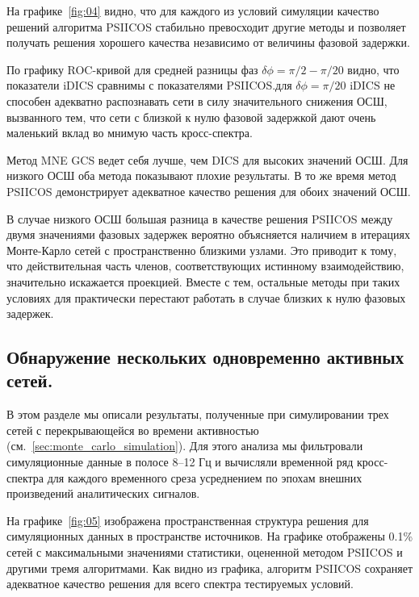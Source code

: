 На графике~\ref{fig:04} видно, что для каждого из условий симуляции качество решений
алгоритма PSIICOS стабильно превосходит другие методы и позволяет получать решения хорошего
качества независимо от величины фазовой задержки.

По графику ROC-кривой для средней разницы фаз $\delta\phi=\pi/2 - \pi/20$ видно, что
показатели iDICS сравнимы с показателями PSIICOS. для $\delta\phi = \pi/20$ iDICS
не способен адекватно распознавать сети в силу значительного снижения ОСШ, вызванного
тем, что сети с близкой к нулю фазовой задержкой дают очень маленький вклад во
мнимую часть кросс-спектра.

Метод MNE GCS ведет себя лучше, чем DICS для высоких значений ОСШ. Для низкого ОСШ
оба метода показывают плохие результаты. В то же время метод PSIICOS демонстрирует
адекватное качество решения для обоих значений ОСШ.

В случае низкого ОСШ большая разница в качестве решения PSIICOS между двумя
значениями фазовых задержек вероятно объясняется наличием в итерациях
Монте-Карло сетей с пространственно близкими узлами. Это приводит к тому, что
действительная часть членов, соответствующих истинному взаимодействию,
значительно искажается проекцией. Вместе с тем, остальные методы при таких
условиях для практически перестают работать в случае близких к нулю фазовых задержек.

\subsection{Обнаружение нескольких одновременно активных сетей.}

В этом разделе мы описали результаты, полученные при симулировании трех сетей с
перекрывающейся во времени активностью (см.~\ref{sec:monte_carlo_simulation}).
Для этого анализа мы фильтровали симуляционные данные в полосе 8--12 Гц и
вычисляли временной ряд кросс-спектра для каждого временного среза усреднением
по эпохам внешних произведений аналитических сигналов.

На графике~\ref{fig:05} изображена пространственная структура решения для
симуляционных данных в пространстве источников. На графике отображены 0.1\% сетей
с максимальными значениями статистики, оцененной методом PSIICOS и другими тремя
алгоритмами. Как видно из графика, алгоритм PSIICOS сохраняет адекватное качество решения
для всего спектра тестируемых условий.

